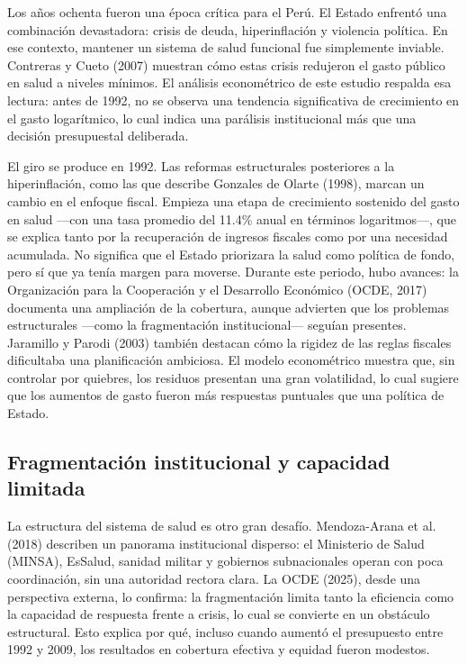 \documentclass[12pt]{article}
\begin{document}
Los años ochenta fueron una época crítica para el Perú. El Estado enfrentó una combinación devastadora: crisis de deuda, hiperinflación y violencia política. En ese contexto, mantener un sistema de salud funcional fue simplemente inviable. Contreras y Cueto (2007) muestran cómo estas crisis redujeron el gasto público en salud a niveles mínimos. El análisis econométrico de este estudio respalda esa lectura: antes de 1992, no se observa una tendencia significativa de crecimiento en el gasto logarítmico, lo cual indica una parálisis institucional más que una decisión presupuestal deliberada.


El giro se produce en 1992. Las reformas estructurales posteriores a la hiperinflación, como las que describe Gonzales de Olarte (1998), marcan un cambio en el enfoque fiscal. Empieza una etapa de crecimiento sostenido del gasto en salud —con una tasa promedio del 11.4\% anual en términos logaritmos—, que se explica tanto por la recuperación de ingresos fiscales como por una necesidad acumulada. No significa que el Estado priorizara la salud como política de fondo, pero sí que ya tenía margen para moverse. Durante este periodo, hubo avances: la Organización para la Cooperación y el Desarrollo Económico (OCDE, 2017) documenta una ampliación de la cobertura, aunque advierten que los problemas estructurales —como la fragmentación institucional— seguían presentes. Jaramillo y Parodi (2003) también destacan cómo la rigidez de las reglas fiscales dificultaba una planificación ambiciosa. El modelo econométrico muestra que, sin controlar por quiebres, los residuos presentan una gran volatilidad, lo cual sugiere que los aumentos de gasto fueron más respuestas puntuales que una política de Estado.

\subsection{Fragmentación institucional y capacidad limitada}

La estructura del sistema de salud es otro gran desafío. Mendoza-Arana et al. (2018) describen un panorama institucional disperso: el Ministerio de Salud (MINSA), EsSalud, sanidad militar y gobiernos subnacionales operan con poca coordinación, sin una autoridad rectora clara. La OCDE (2025), desde una perspectiva externa, lo confirma: la fragmentación limita tanto la eficiencia como la capacidad de respuesta frente a crisis, lo cual se convierte en un obstáculo estructural. Esto explica por qué, incluso cuando aumentó el presupuesto entre 1992 y 2009, los resultados en cobertura efectiva y equidad fueron modestos. 
\end{document}
